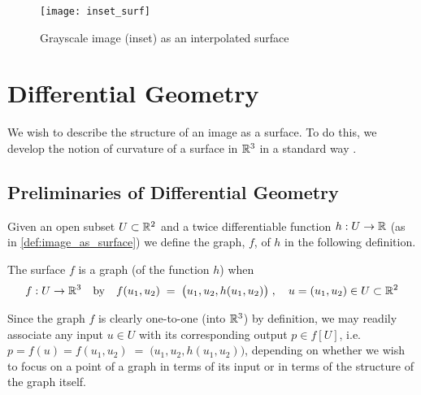 \begin{figure}[t]
\texttt{[image: inset\_surf]}
\caption{Grayscale image (inset) as an interpolated surface}
\label{fig:inset_surf}
\end{figure}
 
\section{Differential Geometry} \label{sec:differential-geometry}
  
We wish to describe the structure of an image as a surface. To do this, we develop the notion of curvature of a surface in $\mathbb{R}^3$ in a standard way \cite{Kuhnel-DiffGeo}.

\subsection{Preliminaries of Differential Geometry}
    Given an open subset $U\subset \mathbb{R}^2$ and a twice differentiable function  $h: U \to \mathbb{R}$ (as in \cref{def:image_as_surface})
    we define the graph, $f$, of $h$ in the following definition.
    
    \begin{defn} \label{def:graph}
    The surface $f$ is a graph (of the function $h$) when 
    \[
     f: U \to \mathbb{R}^3 \quad \textrm{by} \quad f(u_1, u_2) \;=\; \big(u_1 , u_2 , h(u_1,u_2)\big)
     \;,\quad u = (u_1, u_2) \in U \subset \mathbb{R}^2 \]
    \end{defn}
    Since the graph $f$ is clearly one-to-one (into $\mathbb{R}^3$) by definition, we may readily associate any input $u\in U$ with
    its corresponding output $p \in f[U]$, i.e.
    $ p = f(u) = f(u_1, u_2) \;=\; \big(u_1 , u_2 , h(u_1,u_2)\big)$,
    depending on whether we wish to focus on a point of a graph in terms of its input
    or in terms of the structure of the graph itself.
    
